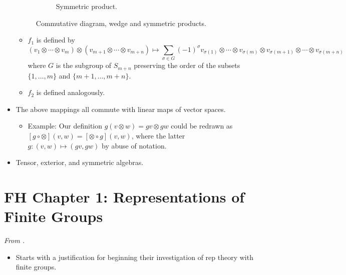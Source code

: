 \documentclass[../notes.tex]{subfiles}
\begin{document}
\begin{itemize}
\begin{figure}[h!]
\begin{subfigure}[b]{0.35\linewidth}
            \vspace{-1.5em}
            \caption{Symmetric product.}
            \label{fig:CDwedgeSymb}
        \end{subfigure}
        \EnableQuotes
        \caption{Commutative diagram, wedge and symmetric products.}
        \label{fig:CDwedgeSym}
    \end{figure}
    \begin{itemize}
        \item $f_1$ is defined by
        \begin{equation*}
            (v_1\otimes\cdots\otimes v_m)\otimes(v_{m+1}\otimes\cdots\otimes v_{m+n}) \mapsto \sum_{\sigma\in G}(-1)^\sigma v_{\sigma(1)}\otimes\cdots\otimes v_{\sigma(m)}\otimes v_{\sigma(m+1)}\otimes\cdots\otimes v_{\sigma(m+n)}
        \end{equation*}
        where $G$ is the subgroup of $S_{m+n}$ preserving the order of the subsets $\{1,\dots,m\}$ and $\{m+1,\dots,m+n\}$.
        \item $f_2$ is defined analogously.
    \end{itemize}
    \item The above mappings all commute with linear maps of vector spaces.
    \begin{itemize}
        \item Example: Our definition $g(v\otimes w)=gv\otimes gw$ could be redrawn as $[g\circ\otimes](v,w)=[\otimes\circ g](v,w)$, where the latter $g:(v,w)\mapsto(gv,gw)$ by abuse of notation.
    \end{itemize}
    \item Tensor, exterior, and symmetric algebras.
\end{itemize}



\section{FH Chapter 1: Representations of Finite Groups}\label{sse:FH1}
\emph{From \textcite{bib:FultonHarris}.}
\begin{itemize}
    \item {}Starts with a justification for beginning their investigation of rep theory with finite groups.
\end{itemize}
\end{document}
